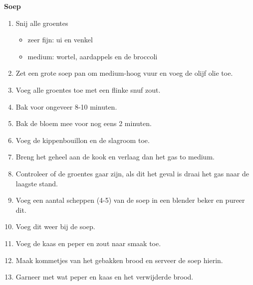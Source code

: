 \begin{multicols}{2}
    \textbf{Soep}
    \begin{enumerate}
        \item Snij alle groentes
        \begin{itemize}
            \item zeer fijn: ui en venkel
            \item medium: wortel, aardappels en de broccoli
        \end{itemize}
        \item Zet een grote soep pan om medium-hoog vuur en voeg de olijf olie toe.
        \item Voeg alle groentes toe met een flinke snuf zout.
        \item Bak voor ongeveer 8-10 minuten.
        \item Bak de bloem mee voor nog eens 2 minuten.
        \item Voeg de kippenbouillon en de slagroom toe.
        \item Breng het geheel aan de kook en verlaag dan het gas to medium.
        \item Controleer of de groentes gaar zijn, als dit het geval is draai het gas naar de laagste stand.
        \item Voeg een aantal scheppen (4-5) van de soep in een blender beker en pureer dit.
        \item Voeg dit weer bij de soep.
        \item Voeg de kaas en peper en zout naar smaak toe.
        \item Maak kommetjes van het gebakken brood en serveer de soep hierin.
        \item Garneer met wat peper en kaas en het verwijderde brood.
    \end{enumerate}    
\end{multicols}

